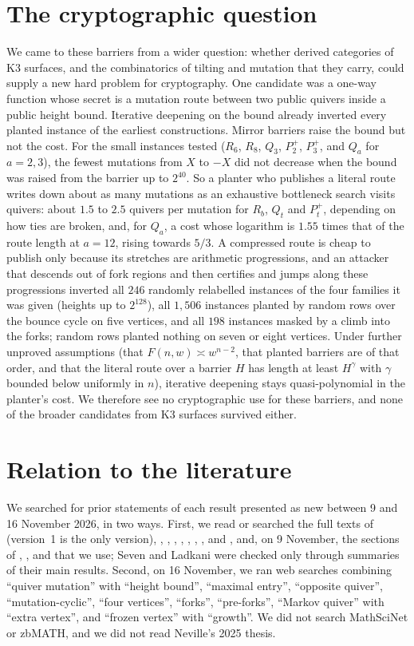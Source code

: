 \documentclass[11pt]{amsart}
\theoremstyle{definition}
\theoremstyle{remark}
\begin{document}
\section{The cryptographic question}\label{sec:crypto}
We came to these barriers from a wider question: whether derived categories of K3 surfaces, and the combinatorics of tilting and mutation that they carry, could supply a new hard problem for cryptography. One candidate was a one-way function whose secret is a mutation route between two public quivers inside a public height bound. Iterative deepening on the bound already inverted every planted instance of the earliest constructions. Mirror barriers raise the bound but not the cost. For the small instances tested ($R_6$, $R_8$, $Q_3$, $P^+_2$, $P^+_3$, and $Q_a$ for $a=2,3$), the fewest mutations from $X$ to $-X$ did not decrease when the bound was raised from the barrier up to $2^{40}$. So a planter who publishes a literal route writes down about as many mutations as an exhaustive bottleneck search visits quivers: about $1.5$ to $2.5$ quivers per mutation for $R_b$, $Q_t$ and $P^+_t$, depending on how ties are broken, and, for $Q_a$, a cost whose logarithm is $1.55$ times that of the route length at $a=12$, rising towards $5/3$. A compressed route is cheap to publish only because its stretches are arithmetic progressions, and an attacker that descends out of fork regions and then certifies and jumps along these progressions inverted all $246$ randomly relabelled instances of the four families it was given (heights up to $2^{128}$), all $1{,}506$ instances planted by random rows over the bounce cycle on five vertices, and all $198$ instances masked by a climb into the forks; random rows planted nothing on seven or eight vertices. Under further unproved assumptions (that $F(n,w)\asymp w^{n-2}$, that planted barriers are of that order, and that the literal route over a barrier $H$ has length at least $H^\gamma$ with $\gamma$ bounded below uniformly in $n$), iterative deepening stays quasi-polynomial in the planter's cost. We therefore see no cryptographic use for these barriers, and none of the broader candidates from K3 surfaces survived either.

\section{Relation to the literature}\label{sec:lit}
We searched for prior statements of each result presented as new between 9 and 16 November 2026, in two ways. First, we read or searched the full texts of \cite{AHJL} (version~1 is the only version), \cite{FN-coq}, \cite{FN-long}, \cite{Nev}, \cite{Erv}, \cite{EN}, \cite{War}, \cite{War-sub}, \cite{Sou} and \cite{Che}, and, on 9 November, the sections of \cite{FWZ}, \cite{BBH}, \cite{ABBS} and \cite{CK} that we use; Seven \cite{Sev} and Ladkani \cite{Lad} were checked only through summaries of their main results. Second, on 16 November, we ran web searches combining ``quiver mutation'' with ``height bound'', ``maximal entry'', ``opposite quiver'', ``mutation-cyclic'', ``four vertices'', ``forks'', ``pre-forks'', ``Markov quiver'' with ``extra vertex'', and ``frozen vertex'' with ``growth''. We did not search MathSciNet or zbMATH, and we did not read Neville's 2025 thesis.
\end{document}
